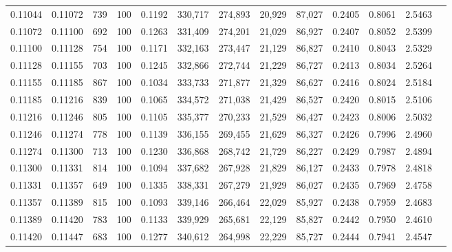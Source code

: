 \begin{tabular}{rrrrrrrrrrrrr}
0.11044 & 0.11072 &   739 & 100 &                                     0.1192 & 330,717 & 274,893 &  20,929 &  87,027 & 0.2405 & 0.8061 & 2.5463 \\
0.11072 & 0.11100 &   692 & 100 &                                     0.1263 & 331,409 & 274,201 &  21,029 &  86,927 & 0.2407 & 0.8052 & 2.5399 \\
0.11100 & 0.11128 &   754 & 100 &                                     0.1171 & 332,163 & 273,447 &  21,129 &  86,827 & 0.2410 & 0.8043 & 2.5329 \\
0.11128 & 0.11155 &   703 & 100 &                                     0.1245 & 332,866 & 272,744 &  21,229 &  86,727 & 0.2413 & 0.8034 & 2.5264 \\
0.11155 & 0.11185 &   867 & 100 &                                     0.1034 & 333,733 & 271,877 &  21,329 &  86,627 & 0.2416 & 0.8024 & 2.5184 \\
0.11185 & 0.11216 &   839 & 100 &                                     0.1065 & 334,572 & 271,038 &  21,429 &  86,527 & 0.2420 & 0.8015 & 2.5106 \\
0.11216 & 0.11246 &   805 & 100 &                                     0.1105 & 335,377 & 270,233 &  21,529 &  86,427 & 0.2423 & 0.8006 & 2.5032 \\
0.11246 & 0.11274 &   778 & 100 &                                     0.1139 & 336,155 & 269,455 &  21,629 &  86,327 & 0.2426 & 0.7996 & 2.4960 \\
0.11274 & 0.11300 &   713 & 100 &                                     0.1230 & 336,868 & 268,742 &  21,729 &  86,227 & 0.2429 & 0.7987 & 2.4894 \\
0.11300 & 0.11331 &   814 & 100 &                                     0.1094 & 337,682 & 267,928 &  21,829 &  86,127 & 0.2433 & 0.7978 & 2.4818 \\
0.11331 & 0.11357 &   649 & 100 &                                     0.1335 & 338,331 & 267,279 &  21,929 &  86,027 & 0.2435 & 0.7969 & 2.4758 \\
0.11357 & 0.11389 &   815 & 100 &                                     0.1093 & 339,146 & 266,464 &  22,029 &  85,927 & 0.2438 & 0.7959 & 2.4683 \\
0.11389 & 0.11420 &   783 & 100 &                                     0.1133 & 339,929 & 265,681 &  22,129 &  85,827 & 0.2442 & 0.7950 & 2.4610 \\
0.11420 & 0.11447 &   683 & 100 &                                     0.1277 & 340,612 & 264,998 &  22,229 &  85,727 & 0.2444 & 0.7941 & 2.4547 \\

\end{tabular}
